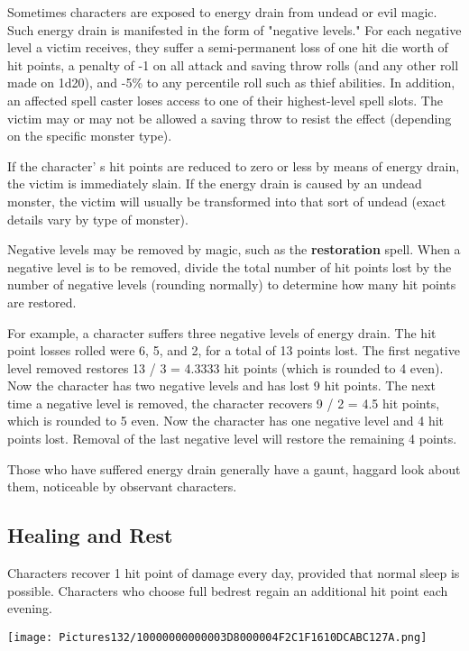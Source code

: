 \documentclass[a4paper,twoside,openany,10pt]{book}
\begin{document}
\begin{multicols}{2}
Sometimes characters are exposed to energy drain from undead or evil magic. Such energy drain is manifested in the form of "negative levels." For each negative level a victim receives, they suffer a semi-permanent loss of one hit die worth of hit points, a penalty of -1 on all attack and saving throw rolls (and any other roll made on 1d20), and -5\% to any percentile roll such as thief abilities. In addition, an affected spell caster loses access to one of their highest-level spell slots. The victim may or may not be allowed a saving throw to resist the effect (depending on the specific monster type).

If the character' s hit points are reduced to zero or less by means of energy drain, the victim is immediately slain. If the energy drain is caused by an undead monster, the victim will usually be transformed into that sort of undead (exact details vary by type of monster).

Negative levels may be removed by magic, such as the \textbf{restoration} spell. When a negative level is to be removed, divide the total number of hit points lost by the number of negative levels (rounding normally) to determine how many hit points are restored.

For example, a character suffers three negative levels of energy drain. The hit point losses rolled were 6, 5, and 2, for a total of 13 points lost. The first negative level removed restores 13 / 3 = 4.3333 hit points (which is rounded to 4 even). Now the character has two negative levels and has lost 9 hit points. The next time a negative level is removed, the character recovers 9 / 2 = 4.5 hit points, which is rounded to 5 even. Now the character has one negative level and 4 hit points lost. Removal of the last negative level will restore the remaining 4 points.

Those who have suffered energy drain generally have a gaunt, haggard look about them, noticeable by observant characters.

\subsection{Healing and Rest}\label{healing-and-rest}

Characters recover 1 hit point of damage every day, provided that normal sleep is possible. Characters who choose full bedrest regain an additional hit point each evening.

\begin{flushleft}
	\texttt{[image: Pictures132/10000000000003D8000004F2C1F1610DCABC127A.png]}
\end{flushleft}



\end{multicols}
\end{document}
